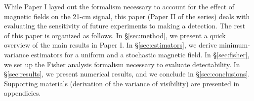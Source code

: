 While Paper I layed out the formalism necessary to account for the effect of  magnetic fields on the 21-cm signal, this paper (Paper II of the series) deals with evaluating the sensitivity of future experiments to making a detection. The rest of this paper is organized as follows. In \S\ref{sec:method}, we present a quick overview of the main results in Paper I. In \S\ref{sec:estimators}, we derive minimum-variance estimators for a uniform and a stochastic magnetic field. In \S\ref{sec:fisher}, we set up the Fisher analysis formalism necessary to evaluate detectability. In \S\ref{sec:results}, we present numerical results, and we conclude in \S\ref{sec:conclusions}. Supporting materials (derivation of the variance of visibility) are presented in appendicies.

